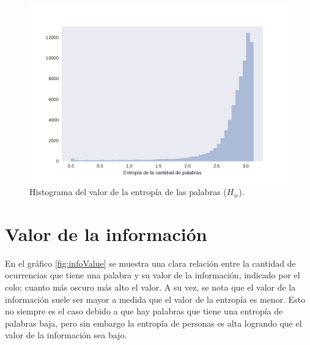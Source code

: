 \begin{figure}[ht]
\centering
\includegraphics[width=1.0\textwidth]{./images/DistribucionEntropia.pdf}
\caption{Histograma del valor de la entropía de las palabras ($H_w$).} 
\label{fig:entropiaPalabras} 
\end{figure}



\section{Valor de la información}
\label{sec:ValorDeLaInformacion}
En el gráfico \ref{fig:infoValue} se muestra una clara relación entre la cantidad de ocurrencias que tiene una palabra y su valor de la información, indicado por el colo: cuanto más oscuro más alto el valor. A su vez, se nota que el valor de la información suele ser mayor a medida que el valor de la entropía es menor. Esto no siempre es el caso debido a que hay palabras que tiene una entropía de palabras baja, pero sin embargo la entropía de personas es alta logrando que el valor de la información sea bajo.

